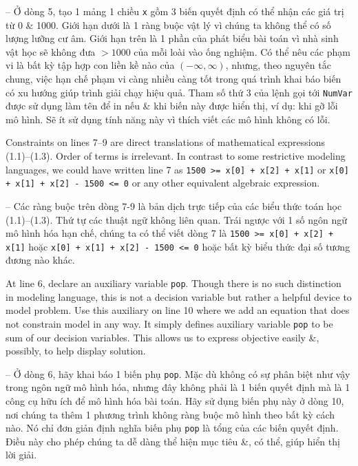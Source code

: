 \documentclass{article}
\begin{document}
\begin{itemize}
\begin{itemize}
        -- Ở dòng 5, tạo 1 mảng 1 chiều {\tt x} gồm 3 biến quyết định có thể nhận các giá trị từ 0 \& 1000. Giới hạn dưới là 1 ràng buộc vật lý vì chúng ta không thể có số lượng lưỡng cư âm. Giới hạn trên là 1 phần của phát biểu bài toán vì nhà sinh vật học sẽ không đưa $> 1000$ của mỗi loài vào ống nghiệm. Có thể nêu các phạm vi là bất kỳ tập hợp con liền kề nào của $(-\infty,\infty)$, nhưng, theo nguyên tắc chung, việc hạn chế phạm vi càng nhiều càng tốt trong quá trình khai báo biến có xu hướng giúp trình giải chạy hiệu quả. Tham số thứ 3 của lệnh gọi tới {\tt NumVar} được sử dụng làm tên để in nếu \& khi biến này được hiển thị, ví dụ: khi gỡ lỗi mô hình. Sẽ ít sử dụng tính năng này vì thích viết các mô hình không có lỗi.

        Constraints on lines 7--9 are direct translations of mathematical expressions (1.1)--(1.3). Order of terms is irrelevant. In contrast to some restrictive modeling languages, we could have written line 7 as \verb|1500 >= x[0] + x[2] + x[1]| or \verb|x[0] + x[1] + x[2] - 1500 <= 0| or any other equivalent algebraic expression.

        -- Các ràng buộc trên dòng 7-9 là bản dịch trực tiếp của các biểu thức toán học (1.1)--(1.3). Thứ tự các thuật ngữ không liên quan. Trái ngược với 1 số ngôn ngữ mô hình hóa hạn chế, chúng ta có thể viết dòng 7 là \verb|1500 >= x[0] + x[2] + x[1]| hoặc \verb|x[0] + x[1] + x[2] - 1500 <= 0| hoặc bất kỳ biểu thức đại số tương đương nào khác.

        At line 6, declare an auxiliary variable {\tt pop}. Though there is no such distinction in modeling language, this is not a decision variable but rather a helpful device to model problem. Use this auxiliary on line 10 where we add an equation that does not constrain model in any way. It simply defines auxiliary variable {\tt pop} to be sum of our decision variables. This allows us to express objective easily \&, possibly, to help display solution.

        -- Ở dòng 6, hãy khai báo 1 biến phụ {\tt pop}. Mặc dù không có sự phân biệt như vậy trong ngôn ngữ mô hình hóa, nhưng đây không phải là 1 biến quyết định mà là 1 công cụ hữu ích để mô hình hóa bài toán. Hãy sử dụng biến phụ này ở dòng 10, nơi chúng ta thêm 1 phương trình không ràng buộc mô hình theo bất kỳ cách nào. Nó chỉ đơn giản định nghĩa biến phụ {\tt pop} là tổng của các biến quyết định. Điều này cho phép chúng ta dễ dàng thể hiện mục tiêu \&, có thể, giúp hiển thị lời giải.


\end{itemize}
\end{itemize}
\end{document}
